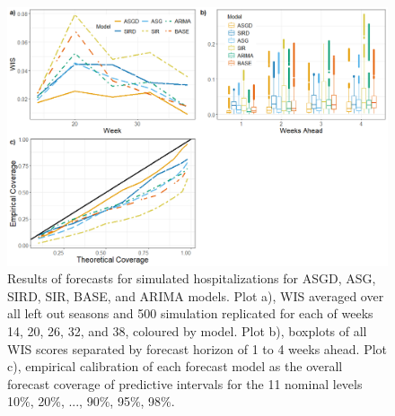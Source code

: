 \begin{figure}[hbt!]
    \begin{adjustwidth}{-.65cm}{-1.5cm}
    \includegraphics[scale=.45]{Images/all_sim_res.png}
    \end{adjustwidth}
    \caption{Results of forecasts for simulated hospitalizations for ASGD, ASG,
    SIRD, SIR, BASE, and ARIMA models. Plot a), WIS averaged over all
    left out seasons and 500 simulation replicated for each of weeks 14, 20, 
    26, 32, and 38, coloured by model. Plot b), boxplots of all WIS 
    scores separated by forecast horizon of 1 to 4 weeks ahead. Plot c),
    empirical calibration of each forecast model as the overall 
    forecast coverage of predictive intervals for the 11 nominal levels
    10\%, 20\%, ..., 90\%, 95\%, 98\%.}
    \label{fig:wis_by_week_horizon}
\end{figure}


